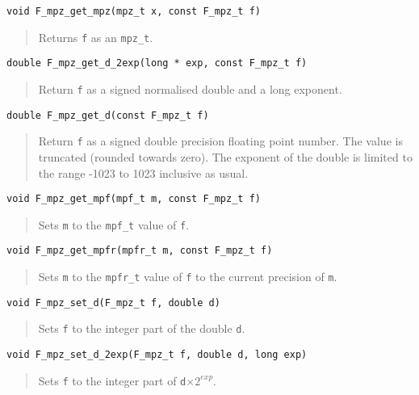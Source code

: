 \documentclass[a4paper,10pt]{article}
\newcommand{\code}{\lstinline}
\begin{document}
\begin{lstlisting}
void F_mpz_get_mpz(mpz_t x, const F_mpz_t f)
\end{lstlisting}
\begin{quote}
Returns \code{f} as an \code{mpz_t}.
\end{quote}

\begin{lstlisting}
double F_mpz_get_d_2exp(long * exp, const F_mpz_t f)
\end{lstlisting}
\begin{quote}
Return \code{f} as a signed normalised double and a long exponent.
\end{quote}

\begin{lstlisting}
double F_mpz_get_d(const F_mpz_t f)
\end{lstlisting}
\begin{quote}
Return \code{f} as a signed double precision floating point number. The value is truncated (rounded towards zero). The exponent of the double is limited to the range -1023 to 1023 inclusive as usual.
\end{quote}

\begin{lstlisting}
void F_mpz_get_mpf(mpf_t m, const F_mpz_t f)
\end{lstlisting}
\begin{quote}
Sets \code{m} to the \code{mpf_t} value of \code{f}.
\end{quote}

\begin{lstlisting}
void F_mpz_get_mpfr(mpfr_t m, const F_mpz_t f)
\end{lstlisting}
\begin{quote}
Sets \code{m} to the \code{mpfr_t} value of \code{f} to the current precision of \code{m}.
\end{quote}

\begin{lstlisting}
void F_mpz_set_d(F_mpz_t f, double d)
\end{lstlisting}
\begin{quote}
Sets \code{f} to the integer part of the double \code{d}.
\end{quote}

\begin{lstlisting}
void F_mpz_set_d_2exp(F_mpz_t f, double d, long exp)
\end{lstlisting}
\begin{quote}
Sets \code{f} to the integer part of \code{d}$\times 2^{exp}$.
\end{quote}
\end{document}
